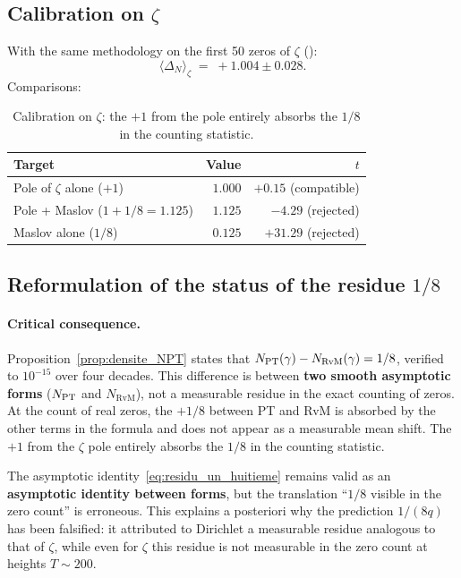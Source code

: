 \subsection{Calibration on $\zeta$}
\label{sec:calibration_zeta}

With the same methodology on the first 50 zeros of $\zeta$
(\cite{Odlyzko1992}):
\begin{equation}
\langle \Delta_N \rangle_\zeta \;=\; +1.004 \pm 0.028.
\label{eq:calib_zeta}
\end{equation}
Comparisons:

\begin{table}[ht]
\centering
\begin{tabular}{@{}lrr@{}}
\toprule
\textbf{Target} & \textbf{Value} & $t$\\
\midrule
Pole of $\zeta$ alone ($+1$) & $1.000$ & $+0.15$ (compatible)\\
Pole + Maslov ($1 + 1/8 = 1.125$) & $1.125$ & $-4.29$ (rejected)\\
Maslov alone ($1/8$) & $0.125$ & $+31.29$ (rejected)\\
\bottomrule
\end{tabular}
\caption{Calibration on $\zeta$: the $+1$ from the pole entirely
absorbs the $1/8$ in the counting statistic.}
\label{tab:calibration_zeta}
\end{table}

\subsection{Reformulation of the status of the residue $1/8$}
\label{sec:reformulation_residu}

\paragraph{Critical consequence.}
Proposition~\ref{prop:densite_NPT} states that
$N_{\mathrm{PT}}(\gamma) - N_{\mathrm{RvM}}(\gamma) = 1/8$, verified to
$10^{-15}$ over four decades. This difference is between \textbf{two
smooth asymptotic forms} ($N_{\mathrm{PT}}$ and $N_{\mathrm{RvM}}$), not a
measurable residue in the exact counting of zeros. At the count of
real zeros, the $+1/8$ between PT and RvM is absorbed by the other
terms in the formula and does not appear as a measurable mean shift.
The $+1$ from the $\zeta$ pole entirely absorbs the $1/8$ in the
counting statistic.

The asymptotic identity~\eqref{eq:residu_un_huitieme} remains valid
as an \textbf{asymptotic identity between forms}, but the
translation ``$1/8$ visible in the zero count'' is erroneous. This
explains a posteriori why the prediction $1/(8q)$ has been
falsified: it attributed to Dirichlet a measurable residue analogous
to that of $\zeta$, while even for $\zeta$ this residue is not
measurable in the zero count at heights $T \sim 200$.

